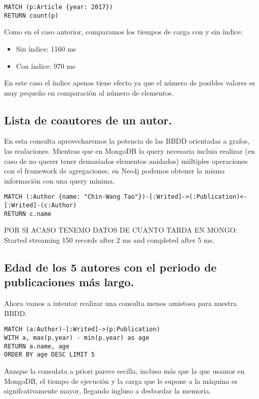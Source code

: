 \begin{verbatim}
MATCH (p:Article {year: 2017})
RETURN count(p)
\end{verbatim}

Como en el caso anterior, comparamos los tiempos de carga con y sin índice:

\begin{itemize}
 \item Sin índice: 1160 ms
 \item Con índice: 970 ms
\end{itemize}

En este caso el índice apenas tiene efecto ya que el número de posibles valores es muy pequeño en comparación al número de elementos.

\subsection{Lista de coautores de un autor.}

En esta consulta aprovecharemos la potencia de las \gls{BBDD} orientadas a grafos, las realaciones. Mientras que en MongoDB la query necesaria incluia realizar (en caso de no querer tener demasiados elementos anidados) múltiples operaciones con el framework de agregaciones, en Neo4j podemos obtener la misma información con una query mínima. 

\begin{verbatim}
MATCH (:Author {name: "Chin-Wang Tao"})-[:Writed]->(:Publication)<-[:Writed]-(c:Author)
RETURN c.name
\end{verbatim}

POR SI ACASO TENEMO DATOS DE CUANTO TARDA EN MONGO:
Started streaming 150 records after 2 ms and completed after 5 ms.

\subsection{Edad de los 5 autores con el periodo de publicaciones más largo.}

Ahora vamos a intentar realizar una consulta menos amistosa para nuestra \gls{BBDD}.

\begin{verbatim}
MATCH (a:Author)-[:Writed]->(p:Publication)
WITH a, max(p.year) - min(p.year) as age
RETURN a.name, age
ORDER BY age DESC LIMIT 5
\end{verbatim}

Aunque la consulata a priori parece secilla, incluso más que la que usamos en MongoDB, el tiempo de ejecución y la carga que le supone a la máquina es signifcativamente mayor, llegando ingluso a desbordar la memoria.